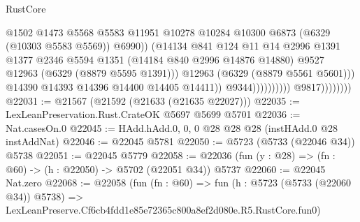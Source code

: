 \begin{lexlean}{RustCore}
\begin{coremodule}
                                                  @1502
                                                  @1473
                                                  @5568
                                                  @5583
                                                  @11951
                                                  @10278
                                                  @10284
                                                  @10300
                                                  @6873
                                                  (@6329 (@10303 @5583 @5569))
                                                  @6990))
                                              (@14134
                                                @841
                                                @124
                                                @11
                                                @14
                                                @2996
                                                @1391
                                                @1377
                                                @2346
                                                @5594
                                                @1351
                                                (@14184 @840 @2996 @14876 @14880)
                                                @9527
                                                @12963
                                                (@6329 (@8879 @5595 @1391)))
                                              @12963
                                              (@6329 (@8879 @5561 @5601)))
                                            @14390
                                            @14393
                                            @14396
                                            @14400
                                            @14405
                                            @14411))
                                        @9344))))))))))
                    @9817))))))))
@22031 := @21567 (@21592 (@21633 (@21635 @22027)))
@22035 := LexLeanPreservation.Rust.CrateOK @5697 @5699 @5701
@22036 := Nat.casesOn.{0}
@22045 := HAdd.hAdd.{0, 0, 0} @28 @28 @28 (instHAdd.{0} @28 instAddNat)
@22046 := @22045 @5781
@22050 := @5723 (@5733 (@22046 @34)) @5738
@22051 := @22045 @5779
@22058 := @22036 (fun (y : @28) => (fn : @60) -> (h : @22050) -> @5702 (@22051 @34)) @5737
@22060 := @22045 Nat.zero
@22068 := @22058
    (fun (fn : @60) =>
    fun (h : @5723 (@5733 (@22060 @34)) @5738) =>
    LexLeanPreserve.Cf6cb4fdd1e85e72365c800a8ef2d080e.R5.RustCore.fun0)

\end{coremodule}
\end{lexlean}
